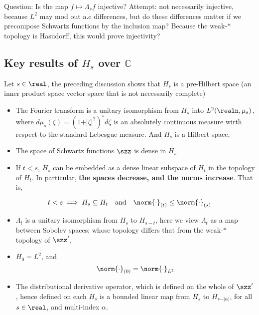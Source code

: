 Question: Is the map \(f\mapsto \Lambda_s f\) injective? Attempt: not
necessarily injective, because \(L^2\) may mod out a.e differences, but
do these differences matter if we precompose Schwartz functions by the
inclusion map? Because the weak-\(\ast\) topology is Hasudorff, this
would prove injectivity?

\hypertarget{key-results-of-h_s-over-mathbbc}{%
\subsection{\texorpdfstring{Key results of \(H_s\) over
\(\mathbb{C}\)}{Key results of H\_s over \textbackslash mathbb\{C\}}}\label{key-results-of-h_s-over-mathbbc}}

Let \(s\in \real\), the preceding discussion shows that \(H_s\) is a
pre-Hilbert space (an inner product space vector space that is not
necessarily complete)

\begin{itemize}
\tightlist
\item
  The Fourier transform is a unitary isomorphism from \(H_s\) into
  \(L^2(\realn,\mu_s)\), where
  \(d\mu_s(\zeta) = (1+\vert\zeta\vert^2)^sd\zeta\) is an absolutely
  continuous measure wirth respect to the standard Lebesgue measure. And
  \(H_s\) is a Hilbert space,
\item
  The space of Schwartz functions \(\szz\) is dense in \(H_s\)
\item
  If \(t < s\), \(H_s\) can be embedded as a dense linear subspace of
  \(H_t\) in the topology of \(H_t\). In particular, \textbf{the spaces
  decrease, and the norms increase}. That is,
\end{itemize}

\[
t<s\implies H_s\subseteq H_t\quad\text{and}\quad \norm{\cdot}_{(t)}\leq\norm{\cdot}_{(s)}
\]

\begin{itemize}
\tightlist
\item
  \(\Lambda_t\) is a unitary isomorphism from \(H_s\) to \(H_{s-t}\),
  here we view \(\Lambda_t\) as a map between Sobolev spaces; whose
  topology differs that from the weak-\(\ast\) topology of \(\szz'\),
\item
  \(H_0 = L^2\), and \[\norm{\cdot}_{(0)} = \norm{\cdot}_{L^2}\]
\item
  The distributional derivative operator, which is defined on the whole
  of \(\szz'\), hence defined on each \(H_s\) is a bounded linear map
  from \(H_s\) to \(H_{s-\vert\alpha\vert}\), for all \(s\in\real\), and
  multi-index \(\alpha\).
\end{itemize}


